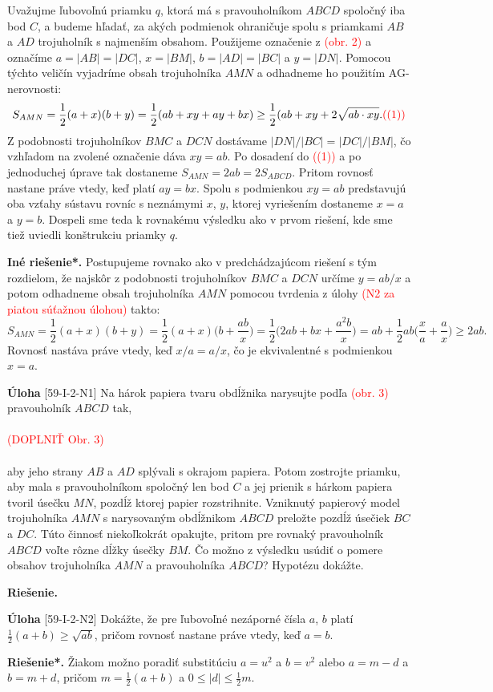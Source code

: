 \documentclass{article}
\newcommand{\rie}{\textbf{Riešenie.} }
\newcommand{\rieh}{\textbf{Riešenie*.} }
\newcommand\todo[1]{\noindent\textcolor{red}{(#1)}}
\newcommand{\problem}[3]{
  \begin{tcolorbox}[breakable,notitle,boxrule=0pt,colback=light-gray,colframe=light-gray]
    \textbf{Úloha}
    [#1] #2
  \end{tcolorbox}
  \noindent#3
}
\begin{document}
{Uvažujme ľubovoľnú priamku $q$, ktorá má s pravouholníkom $ABCD$ spoločný iba
bod $C$, a budeme hľadať, za akých podmienok ohraničuje spolu s priamkami $AB$ a $AD$
trojuholník s najmenším obsahom. Použijeme označenie z \todo{obr. 2} a označíme $a = |AB|
= |DC|$, $x = |BM|$, $b = |AD| = |BC|$ a $y = |DN|$. Pomocou týchto veličín vyjadríme
obsah trojuholníka $AMN$ a odhadneme ho použitím AG-nerovnosti:
$$S_{AMN}=\frac{1}{2}(a + x)(b + y) = \frac{1}{2}(ab + xy + ay + bx)\geq \frac{1}{2}(ab + xy + 2\sqrt{ab \cdot xy}. \todo{(1)}$$
Z podobnosti trojuholníkov $BMC$ a $DCN$ dostávame $|DN|/|BC| = |DC|/|BM|$, čo
vzhľadom na zvolené označenie dáva $xy = ab$. Po dosadení do \todo{(1)} a po jednoduchej
úprave tak dostaneme $S_{AMN} = 2ab = 2S_{ABCD}$. Pritom rovnosť nastane práve vtedy, keď platí $ay = bx$. Spolu s podmienkou $xy = ab$ predstavujú oba vzťahy sústavu rovníc s neznámymi $x$, $y$, ktorej vyriešením dostaneme $x = a$ a $y = b$. Dospeli sme teda
k rovnakému výsledku ako v prvom riešení, kde sme tiež uviedli konštrukciu priamky $q$.

\textbf{Iné riešenie*.} Postupujeme rovnako ako v predchádzajúcom riešení s tým rozdielom, že najskôr z podobnosti trojuholníkov $BMC$ a $DCN$ určíme $y = ab/x$ a potom odhadneme obsah trojuholníka $AMN$ pomocou tvrdenia z úlohy \todo{N2 za piatou súťažnou
úlohou} takto:
$$S_{AMN} =\frac{1}{2}(a + x)(b + y) =\frac{1}{2}(a + x)\bigg(b +\frac{ab}{x}\bigg)=\frac{1}{2}\bigg(2ab + bx + \frac{a^2 b}{x}\bigg)= ab +\frac{1}{2}ab\bigg(\frac{x}{a}+\frac{a}{x}\bigg)\geq 2ab.$$
Rovnosť nastáva práve vtedy, keď $x/a = a/x$, čo je ekvivalentné s podmienkou $x = a$.
}


\problem{59-I-2-N1}{
Na hárok papiera tvaru obdĺžnika narysujte podľa \todo{obr. 3} pravouholník $ABCD$ tak,\\
\\
\todo{DOPLNIŤ Obr. 3}\\
\\
aby jeho strany $AB$ a $AD$ splývali s okrajom papiera. Potom zostrojte priamku, aby mala s pravouholníkom spoločný len bod $C$ a jej prienik s hárkom papiera tvoril úsečku $MN$, pozdĺž ktorej papier rozstrihnite. Vzniknutý papierový model trojuholníka $AMN$ s narysovaným obdĺžnikom $ABCD$ preložte pozdĺž úsečiek $BC$ a $DC$. Túto činnosť niekoľkokrát opakujte, pritom pre rovnaký pravouholník $ABCD$ voľte rôzne dĺžky úsečky $BM$. Čo možno z výsledku usúdiť o pomere obsahov trojuholníka $AMN$ a pravouholníka $ABCD$? Hypotézu dokážte.
}{
\rie 
}

\problem{59-I-2-N2}{
Dokážte, že pre ľubovoľné nezáporné čísla $a$, $b$ platí $\frac{1}{2}(a + b) \geq \sqrt{ab}$, pričom rovnosť nastane práve vtedy, keď $a = b$.
}{
\rieh Žiakom možno poradiť substitúciu $a = u^2$ a $b = v^2$ alebo $a = m-d$ a $b = m + d$, pričom $m = \frac{1}{2}(a + b)$ a $0 \leq |d|\leq \frac{1}{2} m$.
}
\end{document}
